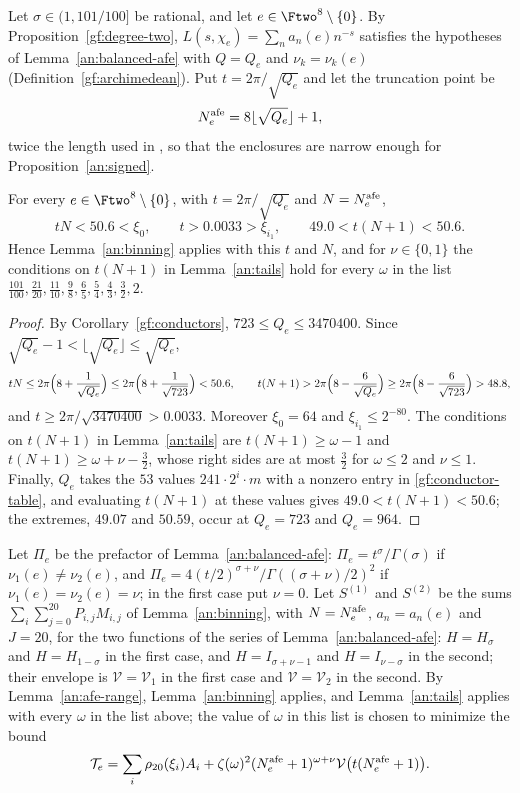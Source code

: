 Let $\sigma\in(1,101/100]$ be rational, and let $e\in\Ftwo^8\setminus\{0\}$.
By Proposition~\ref{gf:degree-two}, $L(s,\chi_e)=\sum_na_n(e)n^{-s}$
satisfies the hypotheses of Lemma~\ref{an:balanced-afe} with $Q=Q_e$ and
$\nu_k=\nu_k(e)$ (Definition~\ref{gf:archimedean}). Put $t=2\pi/\sqrt{Q_e}$ and let the truncation point be
\[
 N^{\rm afe}_e=8\lfloor\sqrt{Q_e}\rfloor+1,
\]
twice the length used in \cite{Naslund04273}, so that the enclosures are
narrow enough for Proposition~\ref{an:signed}.

\begin{lemma}\label{an:afe-range}
For every $e\in\Ftwo^8\setminus\{0\}$, with $t=2\pi/\sqrt{Q_e}$ and
$N=N^{\rm afe}_e$,
\[
 tN<50.6<\xi_0,\qquad t>0.0033>\xi_{i_1},\qquad 49.0<t(N+1)<50.6.
\]
Hence Lemma~\ref{an:binning} applies with this $t$ and $N$, and for
$\nu\in\{0,1\}$ the conditions on $t(N+1)$ in Lemma~\ref{an:tails} hold for every
$\omega$ in the list
$\frac{101}{100},\frac{21}{20},\frac{11}{10},\frac98,\frac65,\frac54,
\frac43,\frac32,2$.
\end{lemma}

\begin{proof}
By Corollary~\ref{gf:conductors}, $723\le Q_e\le3470400$. Since
$\sqrt{Q_e}-1<\lfloor\sqrt{Q_e}\rfloor\le\sqrt{Q_e}$,
\[
 tN\le2\pi\Bigl(8+\frac1{\sqrt{Q_e}}\Bigr)\le2\pi\Bigl(8+\frac1{\sqrt{723}}\Bigr)
 <50.6,\qquad
 t(N+1)>2\pi\Bigl(8-\frac6{\sqrt{Q_e}}\Bigr)\ge2\pi\Bigl(8-\frac6{\sqrt{723}}\Bigr)
 >48.8,
\]
and $t\ge2\pi/\sqrt{3470400}>0.0033$. Moreover $\xi_0=64$ and
$\xi_{i_1}\le2^{-80}$. The conditions on $t(N+1)$ in Lemma~\ref{an:tails} are
$t(N+1)\ge\omega-1$ and $t(N+1)\ge\omega+\nu-\frac32$, whose right sides are
at most $\frac32$ for $\omega\le2$ and $\nu\le1$. Finally, $Q_e$ takes the
$53$ values $241\cdot2^i\cdot m$ with a nonzero entry in
\eqref{gf:conductor-table}, and evaluating $t(N+1)$ at these values gives
$49.0<t(N+1)<50.6$; the extremes, $49.07$ and $50.59$, occur at
$Q_e=723$ and $Q_e=964$.
\end{proof}

Let $\Pi_e$ be the prefactor of Lemma~\ref{an:balanced-afe}:
$\Pi_e=t^\sigma/\Gamma(\sigma)$ if $\nu_1(e)\ne\nu_2(e)$, and
$\Pi_e=4(t/2)^{\sigma+\nu}/\Gamma((\sigma+\nu)/2)^2$ if
$\nu_1(e)=\nu_2(e)=\nu$; in the first case put $\nu=0$. Let $S^{(1)}$ and
$S^{(2)}$ be the sums $\sum_i\sum_{j=0}^{20}P_{i,j}M_{i,j}$ of
Lemma~\ref{an:binning}, with $N=N^{\rm afe}_e$, $a_n=a_n(e)$ and $J=20$, for
the two functions of the series of Lemma~\ref{an:balanced-afe}: $H=H_\sigma$
and $H=H_{1-\sigma}$ in the first case, and $H=I_{\sigma+\nu-1}$ and
$H=I_{\nu-\sigma}$ in the second; their envelope is $\mathcal V=\mathcal V_1$
in the first case and $\mathcal V=\mathcal V_2$ in the second. By
Lemma~\ref{an:afe-range}, Lemma~\ref{an:binning} applies, and
Lemma~\ref{an:tails} applies with every $\omega$ in the list above; the value
of $\omega$ in this list is chosen to minimize the bound
\[
 \mathcal T_e=\sum_i\rho_{20}(\xi_i)A_i
 +\zeta(\omega)^2(N^{\rm afe}_e+1)^{\omega+\nu}
 \mathcal V\bigl(t(N^{\rm afe}_e+1)\bigr).
\]

